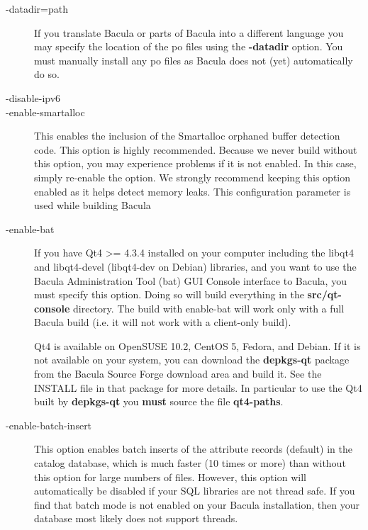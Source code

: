\begin{description}
\item [ {-}{\-}datadir=\lt{}path\gt{} ]
   If you translate Bacula or parts of Bacula into a different language
   you may specify the location of the po files using the {\bf
   {-}{\-}datadir} option. You must manually install any po files as
   Bacula does not (yet) automatically do so.

\item [ {-}{\-}disable-ipv6 ]

\item [ {-}{\-}enable-smartalloc ]
   This enables the inclusion of the Smartalloc orphaned buffer detection
   code.  This option is highly recommended.  Because we never build
   without this option, you may experience problems if it is not enabled.
   In this case, simply re-enable the option.  We strongly recommend
   keeping this option enabled as it helps detect memory leaks.  This
   configuration parameter is used while building Bacula

\item [ {-}{\-}enable-bat ]
   \label{enablebat}
   If you have Qt4 >= 4.3.4 installed on your computer including the
   libqt4 and libqt4-devel (libqt4-dev on Debian) libraries, and you want
   to use the Bacula Administration Tool (bat) GUI Console interface to
   Bacula, you must specify this option.  Doing so will build everything in
   the {\bf src/qt-console} directory.  The build with enable-bat will work
   only with a full Bacula build (i.e. it will not work with a client-only
   build). 

   Qt4 is available on OpenSUSE 10.2, CentOS 5, Fedora, and Debian. If it
   is not available on your system, you can download the {\bf depkgs-qt}
   package from the Bacula Source Forge download area and build it.
   See the
   INSTALL file in that package for more details. In particular to use
   the Qt4 built by {\bf depkgs-qt} you {\bf must} source the file
   {\bf qt4-paths}.

\item [ {-}{\-}enable-batch-insert ]
   This option enables batch inserts of the attribute records (default) in
    the catalog database, which is much faster (10 times or more) than
   without this option for large numbers of files. However, this option
   will automatically be disabled if your SQL libraries are not
   thread safe. If you find that batch mode is not enabled on your Bacula
   installation, then your database most likely does not support threads.


\end{description}
